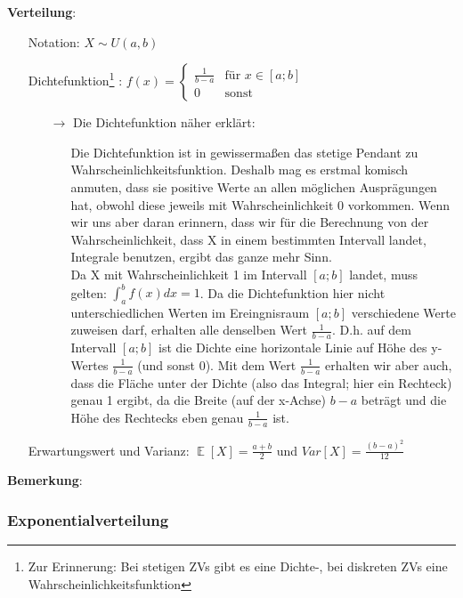 \documentclass[a4paper]{article}
\DeclareMathOperator*{\E}{\mathbb{E}}
\begin{document}
\noindent \textbf{Verteilung}:
\begin{itemize}
\item[] Notation: $X \sim U(a,b)$
\item[] Dichtefunktion\footnote{Zur Erinnerung: Bei stetigen ZVs gibt es eine Dichte-, bei diskreten ZVs eine Wahrscheinlichkeitsfunktion} : $f(x)=\begin{cases}
			\frac{1}{b-a} & \text{für $x \in [a;b]$}\\
            0 & \text{sonst}
		 \end{cases}$ 
	\begin{itemize}
	\item[$\rightarrow$] Die Dichtefunktion näher erklärt:
		\begin{itemize}
		\item[] Die Dichtefunktion ist in gewissermaßen das stetige Pendant zu Wahrscheinlichkeitsfunktion. Deshalb mag es erstmal komisch anmuten, dass sie positive Werte an allen möglichen Ausprägungen hat, obwohl diese jeweils mit Wahrscheinlichkeit 0 vorkommen. Wenn wir uns aber daran erinnern, dass wir für die Berechnung von der Wahrscheinlichkeit, dass X in einem bestimmten Intervall landet, Integrale benutzen, ergibt das ganze mehr Sinn. \\
		\noindent Da X mit Wahrscheinlichkeit 1 im Intervall $[a;b]$ landet, muss gelten: $\int_{a}^{b} f(x)dx = 1$. Da die Dichtefunktion hier nicht unterschiedlichen Werten im Ereingnisraum $[a;b]$ verschiedene Werte zuweisen darf, erhalten alle denselben Wert $\frac{1}{b-a}$. D.h. auf dem Intervall $[a;b]$ ist die Dichte eine horizontale Linie auf Höhe des y-Wertes $\frac{1}{b-a}$ (und sonst 0). Mit dem Wert $\frac{1}{b-a}$ erhalten wir aber auch, dass die Fläche unter der Dichte (also das Integral; hier ein Rechteck) genau 1 ergibt, da die Breite (auf der x-Achse) $b-a$ beträgt und die Höhe des Rechtecks eben genau $\frac{1}{b-a}$ ist.
		\end{itemize}
	\end{itemize}
\item[] Erwartungswert und Varianz: $\E[X]= \frac{a+b}{2}$ und $Var[X]=\frac{(b-a)^2}{12}$

\end{itemize}

\noindent \textbf{Bemerkung}: 

\subsubsection{Exponentialverteilung}\label{sec:Expo}
\end{document}
